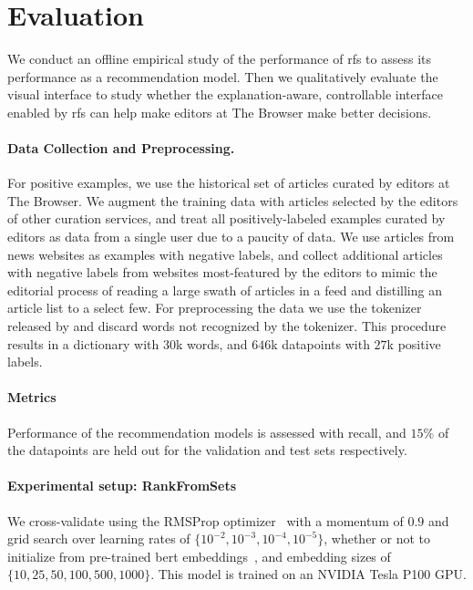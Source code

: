 \section{Evaluation}
\label{sec:experiments}

We conduct an offline empirical study of the performance of \acrlong{rfs} to assess its performance as a recommendation model. Then we qualitatively evaluate the visual interface to study whether the explanation-aware, controllable interface enabled by \gls{rfs} can help make editors at The Browser make better decisions.

\paragraph{Data Collection and Preprocessing.} For positive examples, we use the historical set of articles curated by editors at The Browser. We augment the training data with articles selected by the editors of other curation services, and treat all positively-labeled examples curated by editors as data from a single user due to a paucity of data. We use articles from news websites as examples with negative labels, and collect additional articles with negative labels from websites most-featured by the editors to mimic the editorial process of reading a large swath of articles in a feed and distilling an article list to a select few. For preprocessing the data we use the tokenizer released by \textcite{devlin2019bert:} and discard words not recognized by the tokenizer. This procedure results in a dictionary with $30$k words, and $646$k datapoints with $27$k positive labels.

\paragraph{Metrics} Performance of the recommendation models is assessed with recall, and $15\%$ of the datapoints are held out for the validation and test sets respectively.

\paragraph{Experimental setup: RankFromSets} We cross-validate using the RMSProp optimizer~\parencite{tieleman2012lecture} with a momentum of $0.9$ and grid search over learning rates of $\{10^{-2}, 10^{-3}, 10^{-4}, 10^{-5}\}$, whether or not to initialize from pre-trained \acrshort{bert} embeddings~\parencite{wolf2019huggingfaces}, and embedding sizes of $\{10,25,50, 100, 500, 1000\}$. This model is trained on an NVIDIA Tesla P100 GPU.

